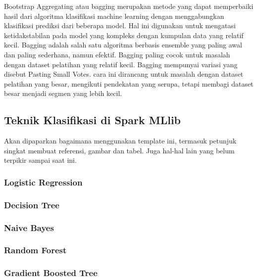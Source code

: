 Bootstrap Aggregating atau bagging merupakan metode yang dapat memperbaiki hasil dari algoritma klasifikasi machine learning dengan menggabungkan klasifikasi prediksi dari beberapa model. Hal ini digunakan untuk mengatasi ketidakstabilan pada model yang kompleks dengan kumpulan data yang relatif kecil. Bagging adalah salah satu algoritma berbasis ensemble yang paling awal dan paling sederhana, namun efektif. Bagging paling cocok untuk masalah dengan dataset pelatihan yang relatif kecil. Bagging mempunyai variasi yang disebut Pasting Small Votes. cara ini dirancang untuk masalah dengan dataset pelatihan yang besar, mengikuti pendekatan yang serupa, tetapi membagi dataset besar menjadi segmen yang lebih kecil.

\subsection{Teknik Klasifikasi di Spark MLlib}
Akan dipaparkan bagaimana menggunakan template ini, termasuk petunjuk singkat membuat referensi, gambar dan tabel.
Juga hal-hal lain yang belum terpikir sampai saat ini. 
 
\subsubsection{Logistic Regression}
\subsubsection{Decision Tree}
\subsubsection{Naive Bayes}
\subsubsection{Random Forest}
\subsubsection{Gradient Boosted Tree}
 
